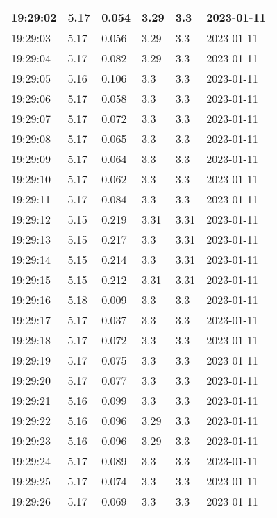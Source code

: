 \begin{longtable}{|l|l|l|l|l|l|}
        19:29:02 & 5.17 & 0.054 & 3.29 & 3.3 & 2023-01-11 \\ \hline
        19:29:03 & 5.17 & 0.056 & 3.29 & 3.3 & 2023-01-11 \\ \hline
        19:29:04 & 5.17 & 0.082 & 3.29 & 3.3 & 2023-01-11 \\ \hline
        19:29:05 & 5.16 & 0.106 & 3.3 & 3.3 & 2023-01-11 \\ \hline
        19:29:06 & 5.17 & 0.058 & 3.3 & 3.3 & 2023-01-11 \\ \hline
        19:29:07 & 5.17 & 0.072 & 3.3 & 3.3 & 2023-01-11 \\ \hline
        19:29:08 & 5.17 & 0.065 & 3.3 & 3.3 & 2023-01-11 \\ \hline
        19:29:09 & 5.17 & 0.064 & 3.3 & 3.3 & 2023-01-11 \\ \hline
        19:29:10 & 5.17 & 0.062 & 3.3 & 3.3 & 2023-01-11 \\ \hline
        19:29:11 & 5.17 & 0.084 & 3.3 & 3.3 & 2023-01-11 \\ \hline
        19:29:12 & 5.15 & 0.219 & 3.31 & 3.31 & 2023-01-11 \\ \hline
        19:29:13 & 5.15 & 0.217 & 3.3 & 3.31 & 2023-01-11 \\ \hline
        19:29:14 & 5.15 & 0.214 & 3.3 & 3.31 & 2023-01-11 \\ \hline
        19:29:15 & 5.15 & 0.212 & 3.31 & 3.31 & 2023-01-11 \\ \hline
        19:29:16 & 5.18 & 0.009 & 3.3 & 3.3 & 2023-01-11 \\ \hline
        19:29:17 & 5.17 & 0.037 & 3.3 & 3.3 & 2023-01-11 \\ \hline
        19:29:18 & 5.17 & 0.072 & 3.3 & 3.3 & 2023-01-11 \\ \hline
        19:29:19 & 5.17 & 0.075 & 3.3 & 3.3 & 2023-01-11 \\ \hline
        19:29:20 & 5.17 & 0.077 & 3.3 & 3.3 & 2023-01-11 \\ \hline
        19:29:21 & 5.16 & 0.099 & 3.3 & 3.3 & 2023-01-11 \\ \hline
        19:29:22 & 5.16 & 0.096 & 3.29 & 3.3 & 2023-01-11 \\ \hline
        19:29:23 & 5.16 & 0.096 & 3.29 & 3.3 & 2023-01-11 \\ \hline
        19:29:24 & 5.17 & 0.089 & 3.3 & 3.3 & 2023-01-11 \\ \hline
        19:29:25 & 5.17 & 0.074 & 3.3 & 3.3 & 2023-01-11 \\ \hline
        19:29:26 & 5.17 & 0.069 & 3.3 & 3.3 & 2023-01-11 \\ \hline

\end{longtable}
